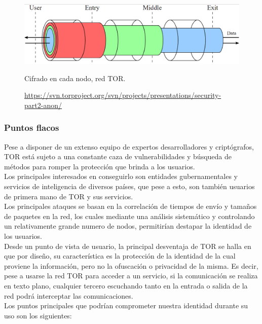 \begin{figure}[H]
	\centering
	\includegraphics[width=\textwidth]{imagenes/tor_keys}
	\caption{Cifrado en cada nodo, red TOR.}
	\caption*{\small \url {https://svn.torproject.org/svn/projects/presentations/security-part2-anon/}}
	\label{fig:torkeys}
\end{figure}

\subsubsection {Puntos flacos}

Pese a disponer de un extenso equipo de expertos desarrolladores y criptógrafos, TOR está sujeto a una constante caza de vulnerabilidades y búsqueda de métodos para romper la protección que brinda a los usuarios. \\
Los principales interesados en conseguirlo son entidades gubernamentales y servicios de inteligencia de diversos países, que pese a esto, son también usuarios de primera mano de TOR y sus servicios. \\ 

Los principales ataques se basan en la correlación de tiempos de envío y tamaños de paquetes en la red, los cuales mediante una análisis sistemático y controlando un relativamente grande numero de nodos, permitirían destapar la identidad de los usuarios. \\

Desde un punto de vista de usuario, la principal desventaja de TOR se halla en que por diseño, su característica es la protección de la identidad de la cual proviene la información, pero no la ofuscación o privacidad de la misma. Es decir, pese a usarse la red TOR para acceder a un servicio, si la comunicación se realiza en texto plano, cualquier tercero escuchando tanto en la entrada o salida de la red podrá interceptar las comunicaciones. \\ 

Los puntos principales que podrían comprometer nuestra identidad durante su uso son los siguientes: \\

